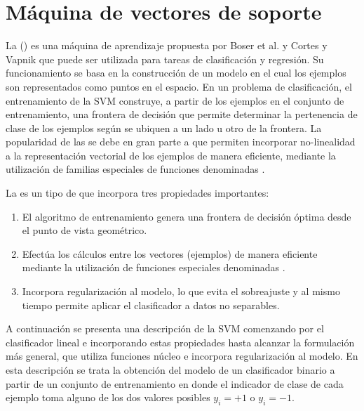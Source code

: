 %
%
%
\section{Máquina de vectores de soporte}
%
La \MVS{} ()
es una máquina de aprendizaje propuesta por Boser et al. \cite{boser}
y Cortes y Vapnik \cite{svm} que puede ser utilizada para tareas de
clasificación y regresión.
Su funcionamiento se basa en la construcción de un modelo en el cual
los ejemplos son representados como puntos en el espacio.
En un problema de clasificación, el entrenamiento de la SVM construye,
a partir de los ejemplos en el conjunto de entrenamiento, una frontera
de decisión que permite determinar la pertenencia de clase de los
ejemplos según se ubiquen a un lado u otro de la frontera.
La popularidad de las  se debe en gran
parte a que permiten incorporar no-linealidad a la representación
vectorial de los ejemplos de manera eficiente, mediante la utilización
de familias especiales de funciones denominadas .

La \MVS{} es un tipo de  que incorpora tres propiedades importantes:
%
\begin{enumerate}
\item El algoritmo de entrenamiento genera una frontera de decisión
  óptima desde el punto de vista geométrico.
\item Efectúa los cálculos entre los vectores (ejemplos) de manera
  eficiente mediante la utilización de funciones especiales
  denominadas .
\item Incorpora regularización al modelo, lo que evita el sobreajuste
  y al mismo tiempo permite aplicar el clasificador a datos no
  separables.
\end{enumerate}
%
A continuación se presenta una descripción de la SVM comenzando por el
clasificador lineal e incorporando estas propiedades hasta alcanzar la
formulación más general, que utiliza funciones núcleo e incorpora
regularización al modelo.
En esta descripción se trata la obtención del modelo de un
clasificador binario a partir de un conjunto de entrenamiento en donde
el indicador de clase de cada ejemplo toma alguno de los dos valores
posibles $y_i=+1$ o $y_i=-1$.
